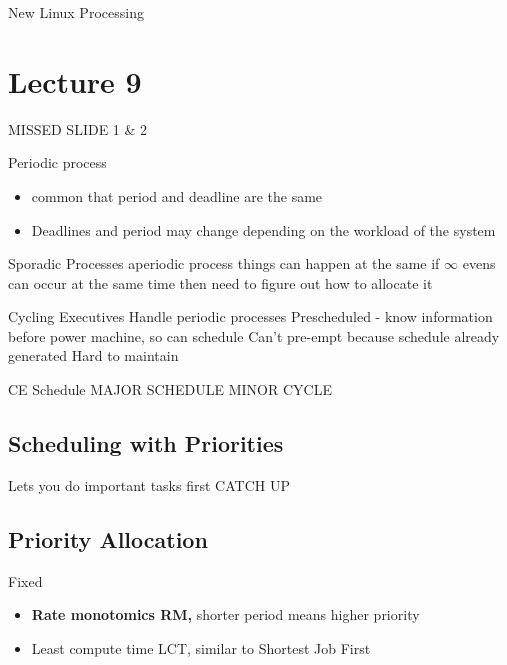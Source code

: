 \documentclass{article}
\begin{document}
	New Linux Processing


\section{Lecture 9}
	MISSED SLIDE 1 \& 2

	Periodic process
	\begin{itemize}
		\item common that period and deadline are the same
		\item Deadlines and period may change depending on the workload of the system
	\end{itemize}

	Sporadic Processes
	aperiodic process
		things can happen at the same
		if $\infty$ evens can occur at the same time then need to figure out how to allocate it

	Cycling Executives
	Handle periodic processes
	Prescheduled - know information before power machine, so can schedule
	Can't pre-empt because schedule already generated
	Hard to maintain

	CE Schedule
	MAJOR SCHEDULE
	MINOR CYCLE

	\subsection{Scheduling with Priorities}
	Lets you do important tasks first
	CATCH UP

	\subsection{Priority Allocation}
		Fixed
		\begin{itemize}
			\item \textbf{Rate monotomics RM,} shorter period means higher priority
			\item Least compute time LCT, similar to Shortest Job First
		\end{itemize}
\end{document}
